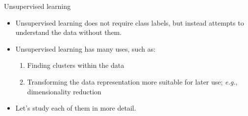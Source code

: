 \documentclass[10pt, aspectratio=169]{beamer} %
\begin{document}
\begin{frame}[fragile]{Unsupervised learning}
	\begin{itemize}
		\item Unsupervised learning does not require class labels, but instead attempts to understand the data without them.
		\item Unsupervised learning has many uses, such as:
			\begin{enumerate}
				\item Finding clusters within the data
				\item Transforming the data representation more suitable for later use; \emph{e.g.}, dimensionality reduction
			\end{enumerate}
			\item Let's study each of them in more detail.
	\end{itemize}
\end{frame}
\end{document}
